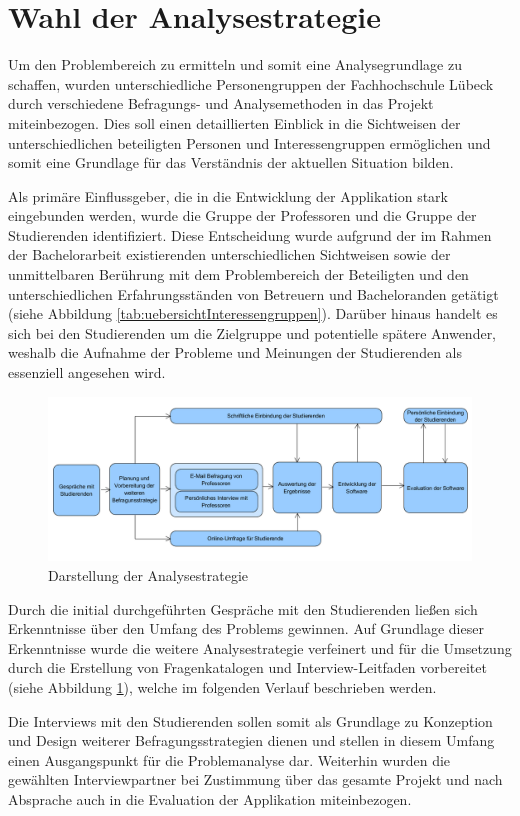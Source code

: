 \documentclass[bibliography=totoc,listof=totoc,BCOR=5mm,DIV=12,oneside]{scrbook}
\begin{document}
\newpage
\section{Wahl der Analysestrategie}
\par Um den Problembereich zu ermitteln und somit eine Analysegrundlage zu schaffen, wurden unterschiedliche Personengruppen der Fachhochschule Lübeck durch verschiedene Befragungs- und Analysemethoden in das Projekt miteinbezogen. Dies soll einen detaillierten Einblick in die Sichtweisen der unterschiedlichen beteiligten Personen und Interessengruppen ermöglichen und somit eine Grundlage für das Verständnis der aktuellen Situation bilden.

\par Als primäre Einflussgeber, die in die Entwicklung der Applikation stark eingebunden werden, wurde die Gruppe der Professoren und die Gruppe der Studierenden identifiziert. Diese Entscheidung wurde aufgrund der im Rahmen der Bachelorarbeit existierenden unterschiedlichen Sichtweisen sowie der unmittelbaren Berührung mit dem Problembereich der Beteiligten und den unterschiedlichen Erfahrungsständen von Betreuern und Bacheloranden getätigt (siehe Abbildung \ref{tab:uebersichtInteressengruppen}). Darüber hinaus handelt es sich bei den Studierenden um die Zielgruppe und potentielle spätere Anwender, weshalb die Aufnahme der Probleme und Meinungen der Studierenden als essenziell angesehen wird. 

\bigskip
\begin{figure}[H]
	\centering
	\includegraphics[width=1\textwidth, keepaspectratio]{Bilder/Diagramme/Analysestrategie.png}
	\caption{Darstellung der Analysestrategie}
	\label{img:analysestrategie}
\end{figure}

\par Durch die initial durchgeführten Gespräche mit den Studierenden ließen sich Erkenntnisse über den Umfang des Problems gewinnen. Auf Grundlage dieser Erkenntnisse wurde die weitere Analysestrategie verfeinert und für die Umsetzung durch die Erstellung von Fragenkatalogen und Interview-Leitfaden vorbereitet (siehe Abbildung \ref{img:analysestrategie}), welche im folgenden Verlauf beschrieben werden.
\par Die Interviews mit den Studierenden sollen somit als Grundlage zu Konzeption und Design weiterer Befragungsstrategien dienen und stellen in diesem Umfang einen Ausgangspunkt für die Problemanalyse dar. Weiterhin wurden die gewählten Interviewpartner bei Zustimmung über das gesamte Projekt und nach Absprache auch in die Evaluation der Applikation miteinbezogen.
\end{document}
